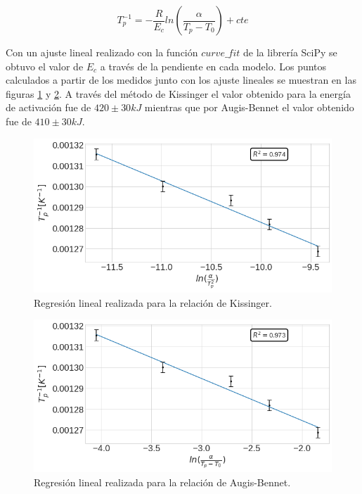 \documentclass[12pt]{article}
\theoremstyle{definition}
\theoremstyle{remark}
\begin{document}
{\begin{equation}
	T_p^{-1}=-\frac{R}{E_c}ln(\frac{\alpha}{T_p-T_0})+cte
\end{equation}

Con un ajuste lineal realizado con la función $curve\_fit$ de la librería SciPy se obtuvo el valor de $E_c$ a través de la pendiente en cada modelo. Los puntos calculados a partir de los medidos junto con los ajuste lineales se muestran en las figuras \ref{Kiss} y \ref{AugBen}. A través del método de Kissinger el valor obtenido para la energía de activación fue de $420 \pm 30 kJ$ mientras que por Augis-Bennet el valor obtenido fue de $410 \pm 30 kJ$.


\begin{figure}[H]
 	\centering
	\includegraphics[scale=0.4]{img/Kissinger.png}
 	\caption{Regresión lineal realizada para la relación de Kissinger.}
	\label{Kiss}
\end{figure} 

 \begin{figure}[H]
 	\centering
	\includegraphics[scale=0.4]{img/Augis_bennet.png}
 	\caption{Regresión lineal realizada para la relación de Augis-Bennet.}
	\label{AugBen}
\end{figure} 

}
\end{document}
